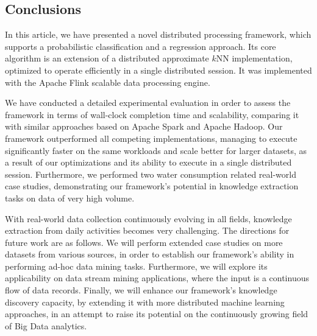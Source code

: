 \subsection{Conclusions}
\label{sec:sec_conc}
In this article, we have presented a novel distributed processing framework, which supports a probabilistic classification and a regression approach. Its core algorithm is an extension of a distributed approximate $k$NN implementation, optimized to operate efficiently in a single distributed session. It was implemented with the Apache Flink scalable data processing engine.

We have conducted a detailed experimental evaluation in order to assess the framework in terms of wall-clock completion time and scalability, comparing it with similar approaches based on Apache Spark and Apache Hadoop. Our framework outperformed all competing implementations, managing to execute significantly faster on the same workloads and scale better for larger datasets, as a result of our optimizations and its ability to execute in a single distributed session. Furthermore, we performed two water consumption related real-world case studies, demonstrating our framework's potential in knowledge extraction tasks on data of very high volume.

With real-world data collection continuously evolving in all fields, knowledge extraction from daily activities becomes very challenging. The directions for future work are as follows. We will perform extended case studies on more datasets from various sources, in order to establish our framework's ability in performing ad-hoc data mining tasks. Furthermore, we will explore its applicability on data stream mining applications, where the input is a continuous flow of data records. Finally, we will enhance our framework's knowledge discovery capacity, by extending it with more distributed machine learning approaches, in an attempt to raise its potential on the continuously growing field of Big Data analytics.
